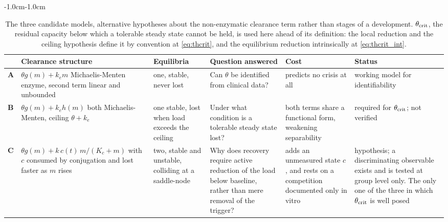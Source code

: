 \begin{table}[htbp]
\centering
\footnotesize
\caption{The three candidate models, alternative hypotheses about the non-enzymatic
clearance term rather than stages of a development. $\theta_{\mathrm{crit}}$, the residual capacity
below which a tolerable steady state cannot be held, is used here ahead of its definition:
the local reduction and the ceiling hypothesis define it by convention at
\eqref{eq:thcrit}, and the equilibrium reduction intrinsically at \eqref{eq:thcrit_int}.}
\label{tab:models}
\begin{adjustwidth}{-1.0cm}{-1.0cm}
\begin{tabular}{@{}p{} p{} p{} p{} p{} p{}@{}}
\toprule
& \textbf{Clearance structure} & \textbf{Equilibria} & \textbf{Question answered}
& \textbf{Cost} & \textbf{Status} \\
\midrule
\textbf{A} &
$\theta g(m) + k_e m$ \newline Michaelis-Menten enzyme, second term linear and unbounded &
one, stable, never lost &
Can $\theta$ be identified from clinical data? &
predicts no crisis at all &
working model for identifiability \\
\addlinespace
\textbf{B} &
$\theta g(m) + k_e h(m)$ \newline both Michaelis-Menten, ceiling $\theta + k_e$ &
one stable, lost when load exceeds the ceiling &
Under what condition is a tolerable steady state lost? &
both terms share a functional form, weakening separability &
required for $\theta_{\mathrm{crit}}$; not verified \\
\addlinespace
\textbf{C} &
$\theta g(m) + k\,c(t)\,m/(K_c+m)$ \newline with $c$ consumed by conjugation and lost
faster as $m$ rises &
two, stable and unstable, colliding at a saddle-node &
Why does recovery require active reduction of the load below baseline, rather than mere
removal of the trigger? &
adds an unmeasured state $c$, and rests on a competition documented only in vitro &
hypothesis; a discriminating observable exists and is tested at group level only. The only
one of the three in which $\theta_{\mathrm{crit}}$ is well posed \\
\bottomrule
\end{tabular}
\end{adjustwidth}
\end{table}

